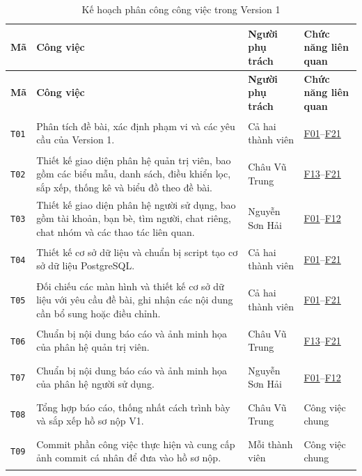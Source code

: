 \begingroup
\small
\setlength{\tabcolsep}{4pt}
\begin{longtable}{|C{1cm}|L{\dimexpr\textwidth-6.6cm-8\arrayrulewidth\relax}|L{3.2cm}|C{2.4cm}|}
  \caption{Kế hoạch phân công công việc trong Version 1}
  \label{tab:ke-hoach-phan-cong}\\
  \hline
  \textbf{Mã} & \textbf{Công việc} & \textbf{Người phụ trách} &
  \textbf{Chức năng liên quan}\\
  \hline
  \endfirsthead
  \hline
  \textbf{Mã} & \textbf{Công việc} & \textbf{Người phụ trách} &
  \textbf{Chức năng liên quan}\\
  \hline
  \endhead
  \hypertarget{T01}{\texttt{T01}} &
    Phân tích đề bài, xác định phạm vi và các yêu cầu của Version 1.
    & Cả hai thành viên & \hyperlink{F01}{F01}--\hyperlink{F21}{F21}\\
  \hline
  \hypertarget{T02}{\texttt{T02}} &
    Thiết kế giao diện phân hệ quản trị viên, bao gồm các biểu mẫu,
      danh sách, điều khiển lọc, sắp xếp, thống kê và biểu đồ theo đề bài.
    & Châu Vũ Trung & \hyperlink{F13}{F13}--\hyperlink{F21}{F21}\\
  \hline
  \hypertarget{T03}{\texttt{T03}} &
    Thiết kế giao diện phân hệ người sử dụng, bao gồm tài khoản,
      bạn bè, tìm người, chat riêng, chat nhóm và các thao tác liên quan.
    & Nguyễn Sơn Hải & \hyperlink{F01}{F01}--\hyperlink{F12}{F12}\\
  \hline
  \hypertarget{T04}{\texttt{T04}} &
    Thiết kế cơ sở dữ liệu và chuẩn bị script tạo cơ sở dữ liệu PostgreSQL.
    & Cả hai thành viên & \hyperlink{F01}{F01}--\hyperlink{F21}{F21}\\
  \hline
  \hypertarget{T05}{\texttt{T05}} &
    Đối chiếu các màn hình và thiết kế cơ sở dữ liệu với yêu cầu đề bài,
      ghi nhận các nội dung cần bổ sung hoặc điều chỉnh.
    & Cả hai thành viên & \hyperlink{F01}{F01}--\hyperlink{F21}{F21}\\
  \hline
  \hypertarget{T06}{\texttt{T06}} &
    Chuẩn bị nội dung báo cáo và ảnh minh họa của phân hệ quản trị viên.
    & Châu Vũ Trung & \hyperlink{F13}{F13}--\hyperlink{F21}{F21}\\
  \hline
  \hypertarget{T07}{\texttt{T07}} &
    Chuẩn bị nội dung báo cáo và ảnh minh họa của phân hệ người sử dụng.
    & Nguyễn Sơn Hải & \hyperlink{F01}{F01}--\hyperlink{F12}{F12}\\
  \hline
  \hypertarget{T08}{\texttt{T08}} &
    Tổng hợp báo cáo, thống nhất cách trình bày và sắp xếp hồ sơ nộp V1.
    & Châu Vũ Trung & Công việc chung\\
  \hline
  \hypertarget{T09}{\texttt{T09}} &
    Commit phần công việc thực hiện và cung cấp ảnh commit cá nhân
      để đưa vào hồ sơ nộp.
    & Mỗi thành viên & Công việc chung\\
  \hline
\end{longtable}
\endgroup

